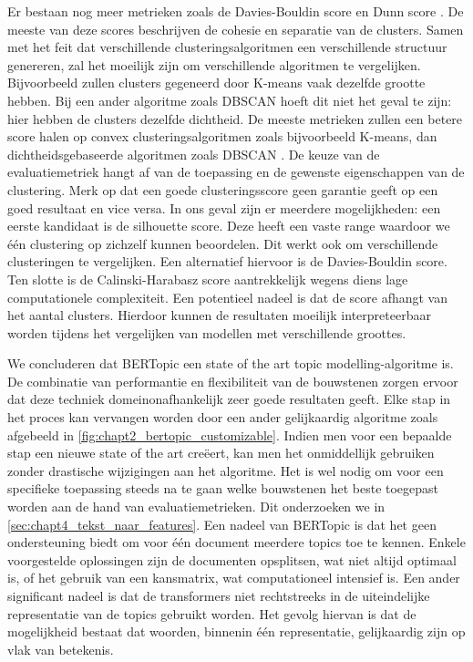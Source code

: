 Er bestaan nog meer metrieken zoals de Davies-Bouldin score \cite{davies_bouldin_paper} en Dunn score \cite{dunn_paper}. De meeste van deze scores beschrijven de cohesie en separatie van de clusters. Samen met het feit dat verschillende clusteringsalgoritmen een verschillende structuur genereren, zal het moeilijk zijn om verschillende algoritmen te vergelijken. Bijvoorbeeld zullen clusters gegeneerd door K-means vaak dezelfde grootte hebben. \cite{cursus_ML_unsupervised} Bij een ander algoritme zoals DBSCAN hoeft dit niet het geval te zijn: hier hebben de clusters dezelfde dichtheid. De meeste metrieken zullen een betere score halen op convex clusteringsalgoritmen zoals bijvoorbeeld K-means, dan dichtheidsgebaseerde algoritmen zoals DBSCAN \cite{eval_metrics_scikit}. De keuze van de evaluatiemetriek hangt af van de toepassing en de gewenste eigenschappen van de clustering. Merk op dat een goede clusteringsscore geen garantie geeft op een goed resultaat en vice versa.\newline
In ons geval zijn er meerdere mogelijkheden: een eerste kandidaat is de silhouette score. Deze heeft een vaste range waardoor we één clustering op zichzelf kunnen beoordelen. Dit werkt ook om verschillende clusteringen te vergelijken. Een alternatief hiervoor is de Davies-Bouldin score. Ten slotte is de Calinski-Harabasz score aantrekkelijk wegens diens lage computationele complexiteit. Een potentieel nadeel is dat de score afhangt van het aantal clusters. Hierdoor kunnen de resultaten moeilijk interpreteerbaar worden tijdens het vergelijken van modellen met verschillende groottes.

We concluderen dat BERTopic een state of the art topic modelling-algoritme is. De combinatie van performantie en flexibiliteit van de bouwstenen zorgen ervoor dat deze techniek domeinonafhankelijk zeer goede resultaten geeft. Elke stap in het proces kan vervangen worden door een ander gelijkaardig algoritme zoals afgebeeld in \autoref{fig:chapt2_bertopic_customizable}. Indien men voor een bepaalde stap een nieuwe state of the art creëert, kan men het onmiddellijk gebruiken zonder drastische wijzigingen aan het algoritme. Het is wel nodig om voor een specifieke toepassing steeds na te gaan welke bouwstenen het beste toegepast worden aan de hand van evaluatiemetrieken. Dit onderzoeken we in \autoref{sec:chapt4_tekst_naar_features}. \newline
Een nadeel van BERTopic is dat het geen ondersteuning biedt om voor één document meerdere topics toe te kennen. Enkele voorgestelde oplossingen zijn de documenten opsplitsen, wat niet altijd optimaal is, of het gebruik van een kansmatrix, wat computationeel intensief is. Een ander significant nadeel is dat de transformers niet rechtstreeks in de uiteindelijke representatie van de topics gebruikt worden. Het gevolg hiervan is dat de mogelijkheid bestaat dat woorden, binnenin één representatie, gelijkaardig zijn op vlak van betekenis.


